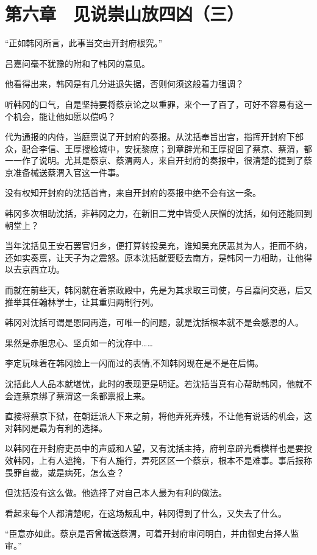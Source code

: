 \section{第六章　见说崇山放四凶（三）}

“正如韩冈所言，此事当交由开封府根究。”

吕嘉问毫不犹豫的附和了韩冈的意见。

他看得出来，韩冈是有几分进退失据，否则何须这般着力强调？

听韩冈的口气，自是坚持要将蔡京论之以重罪，来个一了百了，可好不容易有这一个机会，能让他如愿以偿吗？

代为通报的内侍，当庭禀说了开封府的奏报。从沈括奉旨出宫，指挥开封府下部众，配合李信、王厚搜检城中，安抚黎庶；到章辟光和王厚捉回了蔡京、蔡渭，都一一作了说明。尤其是蔡京、蔡渭两人，来自开封府的奏报中，很清楚的提到了蔡京准备械送蔡渭入官这一件事。

没有权知开封府的沈括首肯，来自开封府的奏报中绝不会有这一条。

韩冈多次相助沈括，非韩冈之力，在新旧二党中皆受人厌憎的沈括，如何还能回到朝堂上？

当年沈括见王安石罢官归乡，便打算转投吴充，谁知吴充厌恶其为人，拒而不纳，还如实奏禀，让天子为之震怒。原本沈括就要贬去南方，是韩冈一力相助，让他得以去京西立功。

而就在前些天，韩冈就在着崇政殿中，先是为其求取三司使，与吕嘉问交恶，后又推举其任翰林学士，让其重归两制行列。

韩冈对沈括可谓是恩同再造，可唯一的问题，就是沈括根本就不是会感恩的人。

果然是赤胆忠心、坚贞如一的沈存中……

李定玩味着在韩冈脸上一闪而过的表情,不知韩冈现在是不是在后悔。

沈括此人人品本就堪忧，此时的表现更是明证。若沈括当真有心帮助韩冈，他就不会连蔡京绑了蔡渭这一条都禀报上来。

直接将蔡京下狱，在朝廷派人下来之前，将他弄死弄残，不让他有说话的机会，这对韩冈是最为有利的选择。

以韩冈在开封府吏员中的声威和人望，又有沈括主持，府判章辟光看模样也是要投效韩冈，上有人遮掩，下有人施行，弄死区区一个蔡京，根本不是难事。事后报称畏罪自裁，或是病死，怎么查？

但沈括没有这么做。他选择了对自己本人最为有利的做法。

看起来每个人都清楚呢，在这场叛乱中，韩冈得到了什么，又失去了什么。

“臣意亦如此。蔡京是否曾械送蔡渭，可着开封府审问明白，并由御史台择人监审。”

